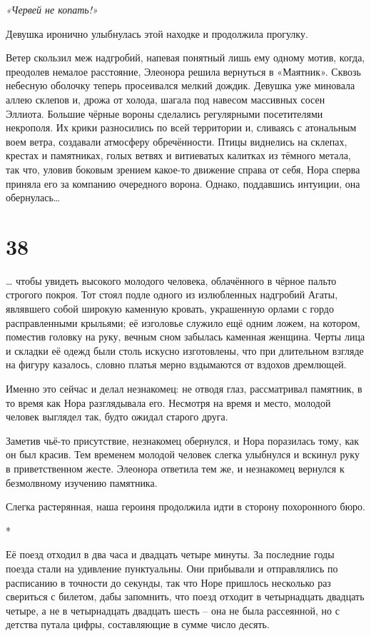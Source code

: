 \documentclass[
  a5paperpaper,
  DIV=11,
  numbers=noendperiod]{scrreprt}
\begin{document}
\emph{«Червей не копать!»}

Девушка иронично улыбнулась этой находке и продолжила прогулку.

Ветер скользил меж надгробий, напевая понятный лишь ему одному мотив,
когда, преодолев немалое расстояние, Элеонора решила вернуться в
«Маятник». Сквозь небесную оболочку теперь просеивался мелкий дождик.
Девушка уже миновала аллею склепов и, дрожа от холода, шагала под
навесом массивных сосен Эллиота. Большие чёрные вороны сделались
регулярными посетителями некрополя. Их крики разносились по всей
территории и, сливаясь с атональным воем ветра, создавали атмосферу
обречённости. Птицы виднелись на склепах, крестах и памятниках, голых
ветвях и витиеватых калитках из тёмного метала, так что, уловив боковым
зрением какое-то движение справа от себя, Нора сперва приняла его за
компанию очередного ворона. Однако, поддавшись интуиции, она
обернулась\ldots{}

\section*{38}\label{38}


\ldots{} чтобы увидеть высокого молодого человека, облачённого в чёрное
пальто строгого покроя. Тот стоял подле одного из излюбленных надгробий
Агаты, являвшего собой широкую каменную кровать, украшенную орлами с
гордо расправленными крыльями; её изголовье служило ещё одним ложем, на
котором, поместив головку на руку, вечным сном забылась каменная
женщина. Черты лица и складки её одежд были столь искусно изготовлены,
что при длительном взгляде на фигуру казалось, словно платья мерно
вздымаются от вздохов дремлющей.

Именно это сейчас и делал незнакомец: не отводя глаз, рассматривал
памятник, в то время как Нора разглядывала его. Несмотря на время и
место, молодой человек выглядел так, будто ожидал старого друга.

Заметив чьё-то присутствие, незнакомец обернулся, и Нора поразилась
тому, как он был красив. Тем временем молодой человек слегка улыбнулся и
вскинул руку в приветственном жесте. Элеонора ответила тем же, и
незнакомец вернулся к безмолвному изучению памятника.

Слегка растерянная, наша героиня продолжила идти в сторону похоронного
бюро.

*

Её поезд отходил в два часа и двадцать четыре минуты. За последние годы
поезда стали на удивление пунктуальны. Они прибывали и отправлялись по
расписанию в точности до секунды, так что Норе пришлось несколько раз
свериться с билетом, дабы запомнить, что поезд отходит в четырнадцать
двадцать четыре, а не в четырнадцать двадцать шесть -- она не была
рассеянной, но с детства путала цифры, составляющие в сумме число
десять.
\end{document}
